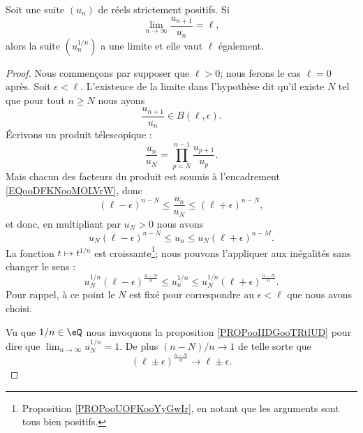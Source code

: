 \begin{lemma}     \label{LEMooNAWTooHWqKBK}
	Soit une suite \( (u_n)\) de réels strictement positifs. Si
	\begin{equation}
		\lim_{n\to \infty} \frac{ u_{n+1} }{ u_n }=\ell,
	\end{equation}
	alors la suite \( (u_n^{1/n})\) a une limite et elle vaut \( \ell\) également.
\end{lemma}

\begin{proof}
	Nous commençons par supposer que \( \ell>0\); nous ferons le cas \( \ell=0\) après. Soit \( \epsilon<\ell\). L'existence de la limite dans l'hypothèse dit qu'il existe \( N\) tel que pour tout \( n\geq N\) nous ayons
	\begin{equation}        \label{EQooDFKNooMOLVrW}
		\frac{ u_{n+1} }{ u_n }\in B(\ell,\epsilon).
	\end{equation}
	Écrivons un produit télescopique :
	\begin{equation}
		\frac{ u_n }{ u_N }=\prod_{p=N}^{n-1}\frac{ u_{p+1} }{ u_p }.
	\end{equation}
	Mais chacun des facteurs du produit est soumis à l'encadrement \eqref{EQooDFKNooMOLVrW}, donc
	\begin{equation}
		(\ell-\epsilon)^{n-N}\leq \frac{ u_n }{ u_N }\leq (\ell+\epsilon)^{n-N},
	\end{equation}
	et donc, en multipliant par \( u_N>0\) nous avons
	\begin{equation}
		u_N(\ell-\epsilon)^{n-N}\leq  u_n  \leq u_N (\ell+\epsilon)^{n-M}.
	\end{equation}
	La fonction \( t\mapsto t^{1/n}\) est croissante\footnote{Proposition \ref{PROPooUOFKooYyGwIr}, en notant que les arguments sont tous bien positifs.}; nous pouvons l'appliquer aux inégalités sans changer le sens :
	\begin{equation}
		u_N^{1/n}(\ell-\epsilon)^{\frac{ n-N }{ n }}\leq u_n^{1/n}\leq u_N^{1/n}(\ell+\epsilon)^{\frac{ n-N }{ n }}.
	\end{equation}
	Pour rappel, à ce point le \( N\) est fixé pour correspondre au \( \epsilon<\ell\) que nous avons choisi.

	Vu que \( 1/n\in \eQ\) nous invoquons la proposition \ref{PROPooIIDGooTRtlUD} pour dire que \( \lim_{n\to \infty} u_N^{1/n}=1\). De plus \( (n-N)/n\to 1\) de telle sorte que
	\begin{equation}
		(\ell\pm \epsilon)^{\frac{ n-N }{ n }}\to\ell\pm\epsilon.
	\end{equation}


\end{proof}
